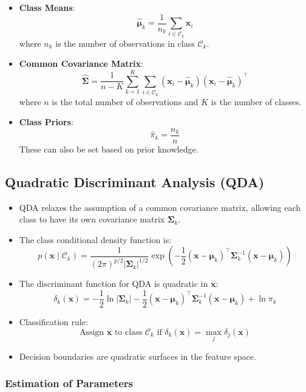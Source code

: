\documentclass{article}
\begin{document}
\begin{itemize}
  \item \textbf{Class Means}:
  \[
  \hat{\boldsymbol{\mu}}_k = \frac{1}{n_k} \sum_{i \in \mathcal{C}_k} \mathbf{x}_i
  \]
  where $n_k$ is the number of observations in class $\mathcal{C}_k$.
  \item \textbf{Common Covariance Matrix}:
  \[
  \hat{\boldsymbol{\Sigma}} = \frac{1}{n - K} \sum_{k=1}^K \sum_{i \in \mathcal{C}_k} (\mathbf{x}_i - \hat{\boldsymbol{\mu}}_k)(\mathbf{x}_i - \hat{\boldsymbol{\mu}}_k)^\top
  \]
  where $n$ is the total number of observations and $K$ is the number of classes.
  \item \textbf{Class Priors}:
  \[
  \hat{\pi}_k = \frac{n_k}{n}
  \]
  These can also be set based on prior knowledge.
\end{itemize}

\subsection{Quadratic Discriminant Analysis (QDA)}

\begin{itemize}
  \item QDA relaxes the assumption of a common covariance matrix, allowing each class to have its own covariance matrix $\boldsymbol{\Sigma}_k$.
  \item The class conditional density function is:
  \[
  p(\mathbf{x} \mid \mathcal{C}_k) = \frac{1}{(2\pi)^{p/2} |\boldsymbol{\Sigma}_k|^{1/2}} \exp\left( -\frac{1}{2} (\mathbf{x} - \boldsymbol{\mu}_k)^\top \boldsymbol{\Sigma}_k^{-1} (\mathbf{x} - \boldsymbol{\mu}_k) \right)
  \]
  \item The discriminant function for QDA is quadratic in $\mathbf{x}$:
  \[
  \delta_k(\mathbf{x}) = -\frac{1}{2} \ln |\boldsymbol{\Sigma}_k| - \frac{1}{2} (\mathbf{x} - \boldsymbol{\mu}_k)^\top \boldsymbol{\Sigma}_k^{-1} (\mathbf{x} - \boldsymbol{\mu}_k) + \ln \pi_k
  \]
  \item Classification rule:
  \[
  \text{Assign } \mathbf{x} \text{ to class } \mathcal{C}_k \text{ if } \delta_k(\mathbf{x}) = \max_{j} \delta_j(\mathbf{x})
  \]
  \item Decision boundaries are quadratic surfaces in the feature space.
\end{itemize}

\subsubsection{Estimation of Parameters}
\end{document}
